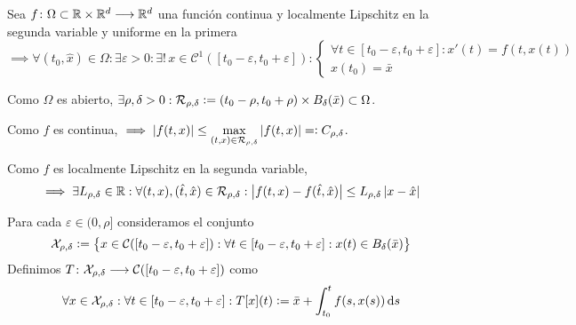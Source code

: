 \begin{teo}
	Sea $f \colon \Omega \subset \mathbb{R} \times \mathbb{R}^d \longrightarrow \mathbb{R}^d$ una función continua y localmente Lipschitz en la segunda variable y uniforme en la primera
	\[\implies \forall (t_0, \hat{x}) \in \Omega : \exists \varepsilon > 0 : \exists! \, x \in \mathcal{C}^1([t_0-\varepsilon, t_0+\varepsilon]) : \begin{cases}
			\forall t \in [t_0-\varepsilon, t_0+\varepsilon] : x'(t) = f(t, x(t)) \\
			x(t_0) = \bar{x}
		\end{cases}\]
	\begin{dem}
		Como $\Omega$ es abierto, $\exists \rho, \delta > 0 : \mathcal{R}_{\rho, \delta} \vcentcolon= (t_0-\rho, t_0+\rho) \times B_{\delta}(\bar{x}) \subset \Omega$.

		Como $f$ es continua, $\displaystyle \implies \left|f(t, x)\right| \leq \max_{(t, x) \in \mathcal{R}_{\rho, \delta}} \left|f(t, x)\right| =\vcentcolon C_{\rho, \delta}$.

		Como $f$ es localmente Lipschitz en la segunda variable,
		\[\implies \exists L_{\rho, \delta} \in \mathbb{R} : \forall (t, x), (\hat{t}, \hat{x}) \in \mathcal{R}_{\rho, \delta} : \left|f(t, x) - f(\hat{t}, \hat{x})\right| \leq L_{\rho, \delta} \left|x-\hat{x}\right|\]

		Para cada $\varepsilon \in (0, \rho]$ consideramos el conjunto
		\[\mathcal{X}_{\rho, \delta} \vcentcolon= \big\{x \in \mathcal{C}([t_0-\varepsilon, t_0+\varepsilon]) : \forall t \in [t_0-\varepsilon, t_0 + \varepsilon] :x(t) \in B_\delta(\bar{x})\big\}\]
		Definimos $T \colon \mathcal{X}_{\rho, \delta} \longrightarrow \mathcal{C}([t_0-\varepsilon, t_0+\varepsilon])$ como
		\[\forall x \in \mathcal{X}_{\rho, \delta} : \forall t \in [t_0-\varepsilon, t_0+\varepsilon] : T[x](t) \defeq \bar{x} + \int_{t_0}^{t} f(s, x(s)) \odif{s}\]


\end{dem}
\end{teo}
